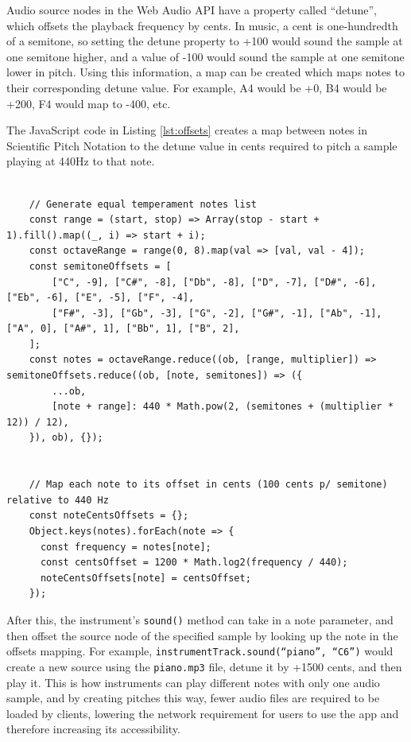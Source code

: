 Audio source nodes in the Web Audio API have a property called “detune”, which offsets the playback frequency by cents. In music, a cent is one-hundredth of a semitone, so setting the detune property to +100 would sound the sample at one semitone higher, and a value of -100 would sound the sample at one semitone lower in pitch. Using this information, a map can be created which maps notes to their corresponding detune value. For example, A4 would be +0, B4 would be +200, F4 would map to -400, etc.

The JavaScript code in Listing \ref{lst:offsets} creates a map between notes in Scientific Pitch Notation to the detune value in cents required to pitch a sample playing at 440Hz to that note.

\begin{lstlisting}[float, caption={Creates a map "noteCentsOffsets" between notes in Scientific Pitch Notation to the detune value in cents required to pitch a sample playing at 440Hz to that note}, label=lst:offsets]

    // Generate equal temperament notes list
    const range = (start, stop) => Array(stop - start + 1).fill().map((_, i) => start + i);
    const octaveRange = range(0, 8).map(val => [val, val - 4]);
    const semitoneOffsets = [
        ["C", -9], ["C#", -8], ["Db", -8], ["D", -7], ["D#", -6], ["Eb", -6], ["E", -5], ["F", -4],
        ["F#", -3], ["Gb", -3], ["G", -2], ["G#", -1], ["Ab", -1], ["A", 0], ["A#", 1], ["Bb", 1], ["B", 2],
    ];
    const notes = octaveRange.reduce((ob, [range, multiplier]) => semitoneOffsets.reduce((ob, [note, semitones]) => ({
        ...ob,
        [note + range]: 440 * Math.pow(2, (semitones + (multiplier * 12)) / 12),
    }), ob), {});
    
    
    // Map each note to its offset in cents (100 cents p/ semitone) relative to 440 Hz
    const noteCentsOffsets = {};
    Object.keys(notes).forEach(note => {
      const frequency = notes[note];
      const centsOffset = 1200 * Math.log2(frequency / 440);
      noteCentsOffsets[note] = centsOffset;
    });

\end{lstlisting}

After this, the instrument’s \verb|sound()| method can take in a note parameter, and then offset the source node of the specified sample by looking up the note in the offsets mapping. For example, \verb|instrumentTrack.sound(“piano”, “C6”)| would create a new source using the \verb|piano.mp3| file, detune it by +1500 cents, and then play it. This is how instruments can play different notes with only one audio sample, and by creating pitches this way, fewer audio files are required to be loaded by clients, lowering the network requirement for users to use the app and therefore increasing its accessibility.

